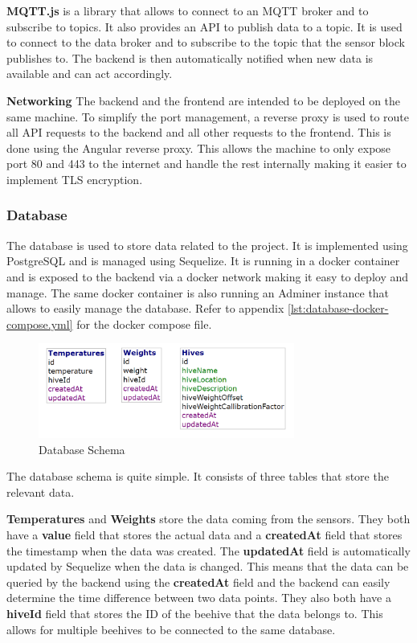 \textbf{MQTT.js} is a library that allows to connect to an MQTT broker and to subscribe to topics. It also provides an API to publish data to a topic. It is used to connect to the data broker and to subscribe to the topic that the sensor block publishes to. The backend is then automatically notified when new data is available and can act accordingly.

\textbf{Networking}
The backend and the frontend are intended to be deployed on the same machine. To simplify the port management, a reverse proxy is used to route all API requests to the backend and all other requests to the frontend. This is done using the Angular reverse proxy. This allows the machine to only expose port 80 and 443 to the internet and handle the rest internally making it easier to implement TLS encryption.

\subsubsection {Database} \label{sec:database}
The database is used to store data related to the project. It is implemented using PostgreSQL and is managed using Sequelize. It is running in a docker container and is exposed to the backend via a docker network making it easy to deploy and manage. The same docker container is also running an Adminer instance that allows to easily manage the database. Refer to appendix \ref{lst:database-docker-compose.yml} for the docker compose file.

\begin{figure}
    \centering
    \includegraphics[width=0.75\textwidth]{figures/database_shema.png}
    \caption{Database Schema}
    \label{fig:database}
\end{figure}

The database schema is quite simple. It consists of three tables that store the relevant data.

\textbf{Temperatures} and \textbf{Weights} store the data coming from the sensors. They both have a \textbf{value} field that stores the actual data and a \textbf{createdAt} field that stores the timestamp when the data was created. The \textbf{updatedAt} field is automatically updated by Sequelize when the data is changed. This means that the data can be queried by the backend using the \textbf{createdAt} field and the backend can easily determine the time difference between two data points. They also both have a \textbf{hiveId} field that stores the ID of the beehive that the data belongs to. This allows for multiple beehives to be connected to the same database.

